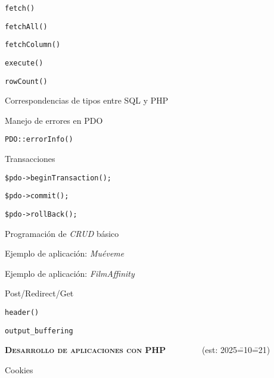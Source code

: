 \begin{longenum}
\begin{longenum}
\begin{longenum}
            \begin{longenum}
                \item \texttt{fetch()}
                \item \texttt{fetchAll()}
                \item \texttt{fetchColumn()}
                \item \texttt{execute()}
                \item \texttt{rowCount()}
            \end{longenum}
            \item Correspondencias de tipos entre SQL y PHP
            \item Manejo de errores en PDO
            \begin{longenum}
                \item \texttt{PDO::errorInfo()}
            \end{longenum}
            \item Transacciones
            \begin{longenum}
                \item \texttt{\$pdo->beginTransaction();}
                \item \texttt{\$pdo->commit();}
                \item \texttt{\$pdo->rollBack();}
            \end{longenum}
        \end{longenum}
        \item Programación de \textit{CRUD} básico
        \begin{longenum}
            \item Ejemplo de aplicación: \textit{Muéveme} 
            \item Ejemplo de aplicación: \textit{FilmAffinity} 
        \end{longenum}
        \item Post/Redirect/Get
        \item \texttt{header()}
        \begin{longenum}
            \item \texttt{output\_buffering}
        \end{longenum}
    \end{longenum}
    \item \textbf{\textsc{Desarrollo de aplicaciones con PHP}} \ \ \ \ \ \ \ \ (est: 2025\==10\==21)
    \begin{longenum}
        \item Cookies

\end{longenum}
\end{longenum}
